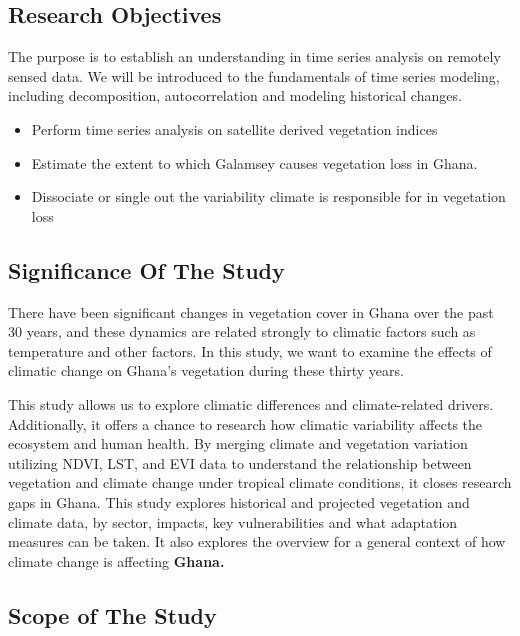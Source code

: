 \documentclass[
  onepage,
  openany]{scrbook}
\begin{document}
\hypertarget{research-objectives}{%
\subsection{Research Objectives}\label{research-objectives}}

The purpose is to establish an understanding in time series analysis on
remotely sensed data. We will be introduced to the fundamentals of time
series modeling, including decomposition, autocorrelation and modeling
historical changes.

\begin{itemize}
\item
  Perform time series analysis on satellite derived vegetation indices
\item
  Estimate the extent to which Galamsey causes vegetation loss in Ghana.
\item
  Dissociate or single out the variability climate is responsible for in
  vegetation loss
\end{itemize}

\hypertarget{significance-of-the-study}{%
\subsection{Significance Of The Study}\label{significance-of-the-study}}

There have been significant changes in vegetation cover in Ghana over
the past 30 years, and these dynamics are related strongly to climatic
factors such as temperature and other factors. In this study, we want to
examine the effects of climatic change on Ghana's vegetation during
these thirty years.

This study allows us to explore climatic differences and climate-related
drivers. Additionally, it offers a chance to research how climatic
variability affects the ecosystem and human health. By merging climate
and vegetation variation utilizing NDVI, LST, and EVI data to understand
the relationship between vegetation and climate change under tropical
climate conditions, it closes research gaps in Ghana. This study
explores historical and projected vegetation and climate data, by
sector, impacts, key vulnerabilities and what adaptation measures can be
taken. It also explores the overview for a general context of how
climate change is affecting \textbf{Ghana.}

\hypertarget{scope-of-the-study}{%
\subsection{Scope of The Study}\label{scope-of-the-study}}
\end{document}
